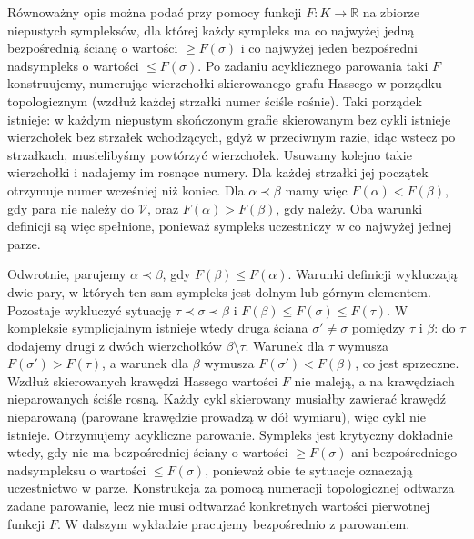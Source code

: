 \begin{uwaga}
Równoważny opis można podać przy pomocy funkcji
$F:K\to\mathbb R$ na zbiorze niepustych sympleksów,
dla której każdy sympleks
ma co najwyżej jedną bezpośrednią ścianę o wartości
$\ge F(\sigma)$ i co najwyżej jeden bezpośredni
nadsympleks o wartości $\le F(\sigma)$.
Po zadaniu acyklicznego parowania taki $F$ konstruujemy,
numerując wierzchołki skierowanego grafu Hassego
w porządku topologicznym (wzdłuż każdej strzałki
numer ściśle rośnie). Taki porządek istnieje:
w każdym niepustym skończonym grafie skierowanym
bez cykli istnieje wierzchołek bez strzałek wchodzących,
gdyż w przeciwnym razie, idąc wstecz po strzałkach,
musielibyśmy powtórzyć wierzchołek. Usuwamy kolejno
takie wierzchołki i nadajemy im rosnące numery.
Dla każdej strzałki jej początek otrzymuje numer
wcześniej niż koniec. Dla $\alpha\prec\beta$ mamy więc
$F(\alpha)<F(\beta)$, gdy para nie należy do
$\mathcal V$, oraz $F(\alpha)>F(\beta)$, gdy należy. Oba warunki definicji są więc
spełnione, ponieważ sympleks uczestniczy w co
najwyżej jednej parze.

Odwrotnie, parujemy $\alpha\prec\beta$, gdy
$F(\beta)\le F(\alpha)$. Warunki definicji wykluczają
dwie pary, w których ten sam sympleks jest dolnym
lub górnym elementem. Pozostaje wykluczyć sytuację
$\tau\prec\sigma\prec\beta$ i
$F(\beta)\le F(\sigma)\le F(\tau)$.
W kompleksie symplicjalnym istnieje wtedy druga
ściana $\sigma'\ne\sigma$ pomiędzy $\tau$ i $\beta$:
do $\tau$ dodajemy drugi z dwóch wierzchołków
$\beta\setminus\tau$. Warunek dla $\tau$ wymusza
$F(\sigma')>F(\tau)$, a warunek dla $\beta$ wymusza
$F(\sigma')<F(\beta)$, co jest sprzeczne.
Wzdłuż skierowanych krawędzi Hassego wartości $F$
nie maleją, a na krawędziach nieparowanych ściśle
rosną. Każdy cykl skierowany musiałby zawierać
krawędź nieparowaną (parowane krawędzie prowadzą
w dół wymiaru), więc cykl nie istnieje.
Otrzymujemy acykliczne parowanie. Sympleks jest
krytyczny dokładnie wtedy, gdy nie ma bezpośredniej
ściany o wartości $\ge F(\sigma)$ ani bezpośredniego
nadsympleksu o wartości $\le F(\sigma)$, ponieważ
obie te sytuacje oznaczają uczestnictwo w parze.
Konstrukcja za pomocą numeracji topologicznej
odtwarza zadane parowanie, lecz nie musi odtwarzać
konkretnych wartości pierwotnej funkcji $F$.
W dalszym wykładzie pracujemy bezpośrednio z parowaniem.
\end{uwaga}

